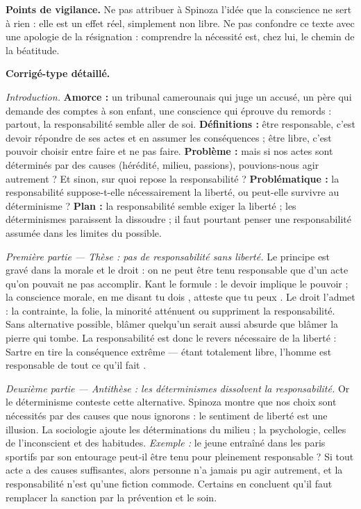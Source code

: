 \documentclass[11pt]{article}
\begin{document}
\begin{corrige}
\textbf{Points de vigilance.} Ne pas attribuer à Spinoza l'idée que la conscience \guillemotleft ne sert à rien \guillemotright : elle est un effet réel, simplement non libre. Ne pas confondre ce texte avec une apologie de la résignation : comprendre la nécessité est, chez lui, le chemin de la béatitude.
\end{corrige}

\begin{corrige}
\textbf{Corrigé-type détaillé.}

\emph{Introduction.} \textbf{Amorce :} un tribunal camerounais qui juge un accusé, un père qui demande des comptes à son enfant, une conscience qui éprouve du remords : partout, la responsabilité semble aller de soi. \textbf{Définitions :} être responsable, c'est devoir répondre de ses actes et en assumer les conséquences ; être libre, c'est pouvoir choisir entre faire et ne pas faire. \textbf{Problème :} mais si nos actes sont déterminés par des causes (hérédité, milieu, passions), pouvions-nous agir autrement ? Et sinon, sur quoi repose la responsabilité ? \textbf{Problématique :} la responsabilité suppose-t-elle nécessairement la liberté, ou peut-elle survivre au déterminisme ? \textbf{Plan :} la responsabilité semble exiger la liberté ; les déterminismes paraissent la dissoudre ; il faut pourtant penser une responsabilité assumée dans les limites du possible.

\emph{Première partie — Thèse : pas de responsabilité sans liberté.} Le principe est gravé dans la morale et le droit : on ne peut être tenu responsable que d'un acte qu'on pouvait ne pas accomplir. Kant le formule : le devoir implique le pouvoir ; la conscience morale, en me disant \guillemotleft tu dois \guillemotright, atteste que \guillemotleft tu peux \guillemotright. Le droit l'admet : la contrainte, la folie, la minorité atténuent ou suppriment la responsabilité. Sans alternative possible, blâmer quelqu'un serait aussi absurde que blâmer la pierre qui tombe. La responsabilité est donc le revers nécessaire de la liberté : Sartre en tire la conséquence extrême — étant totalement libre, l'homme est \guillemotleft responsable de tout ce qu'il fait \guillemotright.

\emph{Deuxième partie — Antithèse : les déterminismes dissolvent la responsabilité.} Or le déterminisme conteste cette alternative. Spinoza montre que nos choix sont nécessités par des causes que nous ignorons : le sentiment de liberté est une illusion. La sociologie ajoute les déterminations du milieu ; la psychologie, celles de l'inconscient et des habitudes. \emph{Exemple :} le jeune entraîné dans les paris sportifs par son entourage peut-il être tenu pour pleinement responsable ? Si tout acte a des causes suffisantes, alors personne n'a jamais pu agir autrement, et la responsabilité n'est qu'une fiction commode. Certains en concluent qu'il faut remplacer la sanction par la prévention et le soin.


\end{corrige}
\end{document}
